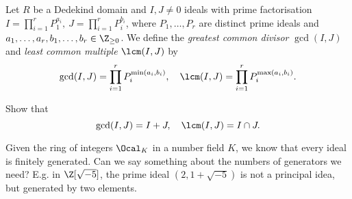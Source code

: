 \begin{defn*}
	Let \( R \) be a Dedekind domain and \( I, J \neq 0 \) ideals with prime factorisation \( I = \prod_{i=1}^r P_1^{a_i},\ J = \prod_{i=1}^r P_i^{b_i} \), where \( P_1, \dotsc, P_r \) are distinct prime ideals and \( a_1, \dotsc, a_r, b_1, \dotsc, b_r \in \Z_{\geq 0} \).
	We define the \emph{greatest common divisor} \( \gcd(I,J) \) and \emph{least common multiple} \( \lcm(I,J) \) by
	\[ \gcd(I,J) = \prod_{i=1}^r P_i^{\min(a_i,b_i)},\quad \lcm(I,J) = \prod_{i=1}^r P_i^{\max(a_i,b_i)}. \]
\end{defn*}

\begin{exc*}
	Show that
	\[ \gcd(I,J) = I + J,\quad \lcm(I,J) = I \cap J. \]
\end{exc*}

\begin{frage*}
	Given the ring of integers \( \Ocal_K \) in a number field \( K \), we know that every ideal is finitely generated.
	Can we say something about the numbers of generators we need?
	E.g. in \( \Z[\sqrt{-5}] \), the prime ideal \( (2, 1+\sqrt{-5}) \) is not a principal idea, but generated by two elements.
\end{frage*}